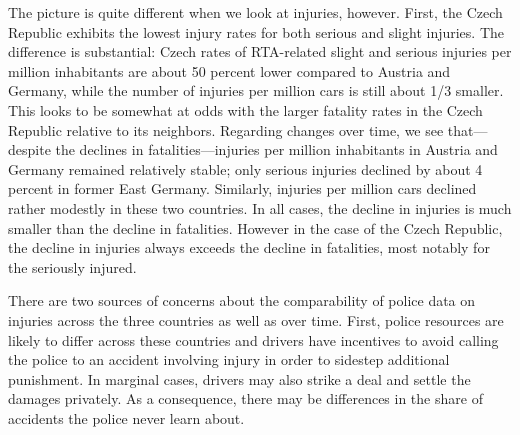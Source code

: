 \documentclass[12pt]{article}
\begin{document}
The picture is quite different when we look at injuries, however. First, the
Czech Republic exhibits the lowest injury rates for both serious and slight
injuries. The difference is substantial: Czech rates of RTA-related slight and
serious injuries per million inhabitants are about 50 percent lower compared to
Austria and Germany, while the number of injuries per million cars is still
about 1/3 smaller. This looks to be somewhat at odds with the  larger fatality
rates in the Czech Republic relative to its neighbors.  Regarding changes over
time, we see that---despite the declines in fatalities---injuries per million
inhabitants in Austria and Germany remained relatively stable; only serious
injuries declined by about 4 percent in former East Germany.  Similarly,
injuries per million cars declined rather modestly in these two countries. In
all cases, the decline in injuries is much smaller than the decline in
fatalities.  However in the case of the Czech Republic, the decline in injuries
always exceeds the decline in fatalities, most notably for the seriously
injured. 

There are two sources of concerns about the comparability of police data on
injuries across the three countries as well as over time. First, police
resources are likely to differ across these countries and drivers have
incentives to avoid calling the police to an accident involving injury in order
to sidestep additional punishment. In marginal cases, drivers may also strike a
deal and settle the damages privately. As a consequence, there may be
differences in the share of accidents the police never learn about.
\end{document}
